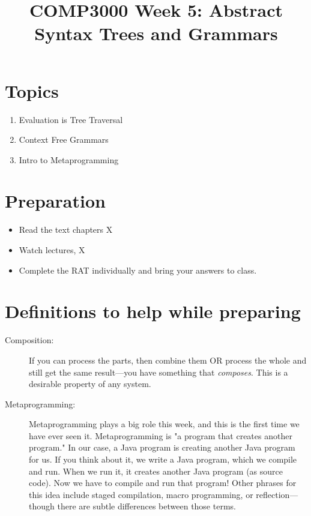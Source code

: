 \documentclass[twoside=false, DIV=14]{scrartcl}
\title{\color{redish} \vspace{-1em}COMP3000 Week 5: Abstract Syntax Trees and Grammars}
\begin{document}
{\color{blackish}\maketitle}\vspace{-7em}

\begin{abstract}
\end{abstract}

\section*{Topics}
\begin{enumerate}
\item Evaluation is Tree Traversal
\item Context Free Grammars
\item Intro to Metaprogramming
\end{enumerate}

\section*{Preparation}
\begin{itemize}
\item Read the text chapters X
\item Watch lectures, X
\item Complete the RAT individually and bring your answers to class.
\end{itemize}

\section*{Definitions to help while preparing}
\begin{description}
\item[Composition:] If you can process the parts, then combine them OR process the whole and still get the same result—you have something that \emph{composes}. This is a desirable property of any system.

\item[Metaprogramming:] Metaprogramming plays a big role this week, and this is the first time we have ever seen it. Metaprogramming is "a program that creates another program." In our case, a Java program is creating another Java program for us. If you think about it, we write a Java program, which we compile and run. When we run it, it creates another Java program (as source code). Now we have to compile and run that program! Other phrases for this idea include staged compilation, macro programming, or reflection—though there are subtle differences between those terms.

\end{description}
\end{document}
